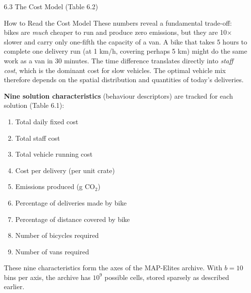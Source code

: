 \documentclass[aspectratio=169,10pt]{beamer}
\begin{document}
\begin{frame}[allowframebreaks]{6.3 The Cost Model (Table 6.2)}
\framebreak

\begin{alertblock}{How to Read the Cost Model}
These numbers reveal a fundamental trade-off: bikes are \emph{much}
cheaper to run and produce zero emissions, but they are 10$\times$
slower and carry only one-fifth the capacity of a van.
A bike that takes 5 hours to complete one delivery run (at 1 km/h,
covering perhaps 5 km) might do the same work as a van in 30 minutes.
The time difference translates directly into \emph{staff cost}, which
is the dominant cost for slow vehicles.
The optimal vehicle mix therefore depends on the spatial distribution
and quantities of today's deliveries.
\end{alertblock}

\medskip
\textbf{Nine solution characteristics} (behaviour descriptors) are
tracked for each solution (Table 6.1):
\begin{enumerate}
  \item Total daily fixed cost
  \item Total staff cost
  \item Total vehicle running cost
  \item Cost per delivery (per unit crate)
  \item Emissions produced (g CO$_2$)
  \item Percentage of deliveries made by bike
  \item Percentage of distance covered by bike
  \item Number of bicycles required
  \item Number of vans required
\end{enumerate}

These nine characteristics form the axes of the MAP-Elites archive.
With $b = 10$ bins per axis, the archive has $10^9$ possible cells,
stored sparsely as described earlier.

\end{frame}
\end{document}

